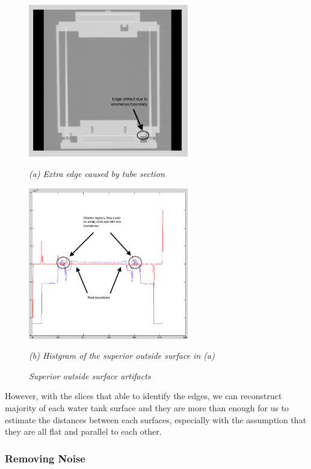 \begin{figure}[htb]
  \begin{minipage}[t]{2.75in}
    \centering
    \centerline{\mbox{\includegraphics[width=2.75in]{data_extraction/images/sample/20121017_125/Coronal/Superior_outside/extra_edge.eps}}}
    \centerline{\emph{(a) Extra edge caused by tube section}}
  \end{minipage}
  \begin{minipage}[t]{2.75in}
    \centering
    \centerline{\mbox{\includegraphics[width=2.75in]{data_extraction/images/sample/20121017_125/Coronal/Superior_outside/extra_edge_histogram.eps}}}
    \centerline{\emph{(b) Histgram of the superior outside surface in (a) }}
  \end{minipage}
  \caption{\emph{Superior outside surface artifacts}}
  \label{fig:superior_outside_artifacts}
\end{figure}

However, with the slices that able to identify the edges,
we can reconstruct majority of each water tank surface and they are more than enough for us to estimate the
distances between each surfaces, especially with the assumption that they are all flat and parallel to each
other.

\subsubsection{Removing Noise}

